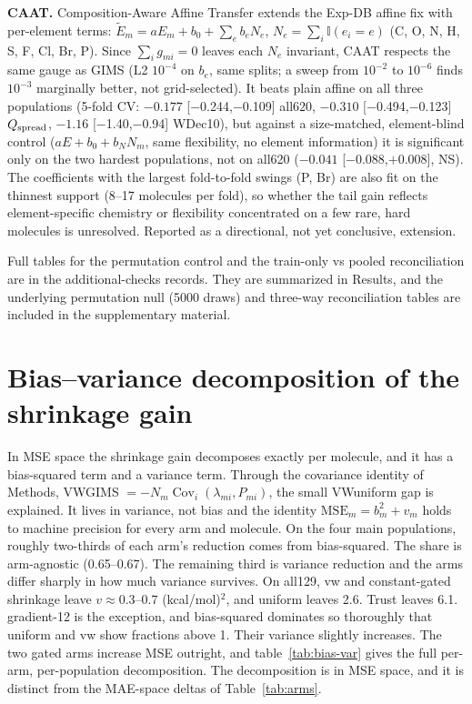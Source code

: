 \documentclass{article}
\begin{document}
\textbf{CAAT.} Composition-Aware Affine Transfer extends the Exp-DB affine
fix with per-element terms: $\tilde E_m=aE_m+b_0+\sum_e b_e N_e$,
$N_e=\sum_i\mathbb{I}(e_i=e)$ (C, O, N, H, S, F, Cl, Br, P). Since
$\sum_i g_{mi}=0$ leaves each $N_e$ invariant, CAAT respects the same gauge
as GIMS (L2 $10^{-4}$ on $b_e$, same splits; a sweep from $10^{-2}$ to
$10^{-6}$ finds $10^{-3}$ marginally better, not grid-selected). It beats
plain affine on all three populations (5-fold CV: $-0.177$
[$-$0.244,$-$0.109] all620, $-0.310$ [$-$0.494,$-$0.123] $Q_{\rm spread}$,
$-1.16$ [$-$1.40,$-$0.94] WDec10), but against a size-matched, element-blind
control ($aE+b_0+b_N N_m$, same flexibility, no element information) it is
significant only on the two hardest populations, not on all620 ($-0.041$
[$-$0.088,$+$0.008], NS). The coefficients with the largest fold-to-fold
swings (P, Br) are also fit on the thinnest support (8--17 molecules per
fold), so whether the tail gain reflects element-specific chemistry or
flexibility concentrated on a few rare, hard molecules is unresolved.
Reported as a directional, not yet conclusive, extension.

Full tables for the permutation control and the train-only vs pooled
reconciliation are in the additional-checks records. They are summarized in
Results, and the underlying permutation null (5000 draws) and three-way
reconciliation tables are included in the supplementary material.

\section{Bias--variance decomposition of the shrinkage gain}
\label{app:bias-var}

In MSE space the shrinkage gain decomposes exactly per molecule, and it has a
bias-squared term and a variance term. Through the covariance identity of Methods, VW\textendash GIMS $=-N_m\operatorname{Cov}_i(\lambda_{mi},P_{mi})$, the small VW\textendash uniform gap is explained. It lives in variance, not bias and the identity
$\mathrm{MSE}_m = b_m^2 + v_m$ holds to machine precision for every arm and
molecule. On the four main populations, roughly two-thirds of each arm's
reduction comes from bias-squared. The share is arm-agnostic (0.65--0.67).
The remaining third is variance reduction and the arms differ sharply in how
much variance survives. On all129, vw and constant-gated shrinkage leave
$v \approx 0.3$--$0.7$ (kcal/mol)$^2$, and uniform leaves 2.6. Trust leaves 6.1.
gradient-12 is the exception, and bias-squared dominates so thoroughly that
uniform and vw show fractions above 1. Their variance slightly increases.
The two gated arms increase MSE outright, and table~\ref{tab:bias-var} gives the
full per-arm, per-population decomposition. The decomposition is in MSE
space, and it is distinct from the MAE-space deltas of Table~\ref{tab:arms}.
\end{document}
